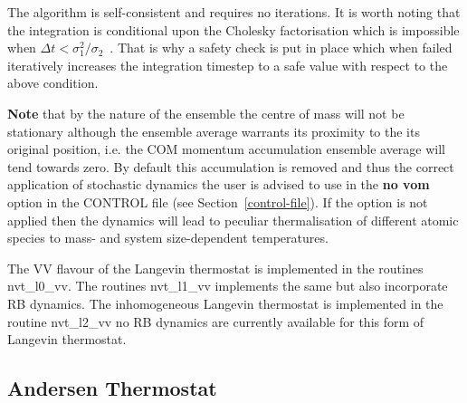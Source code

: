 The algorithm is self-consistent and requires no iterations.
It is worth noting that the integration is conditional upon
the Cholesky factorisation which is impossible when
$\Delta t < \sigma_{1}^{2}/\sigma_{2}$~.  That is why a safety
check is put in place which when failed iteratively increases
the integration timestep to a safe value with respect to the
above condition.

{\bf Note} that by the nature of the ensemble the centre of mass will
not be stationary although the ensemble average warrants its proximity
to the its original position, i.e. the COM momentum accumulation ensemble
average will tend towards zero.  By default this accumulation is removed
and thus the correct application of stochastic dynamics the user is
advised to use in the {\bf no vom} option in the CONTROL file (see
Section~\ref{control-file}).  If the option is not applied then the
dynamics will lead to peculiar thermalisation of different atomic
species to mass- and system size-dependent temperatures.

The VV flavour of the Langevin thermostat is implemented in
the \D routines {\sc nvt\_l0\_vv}.
The routines {\sc nvt\_l1\_vv} implements the
same but also incorporate RB dynamics. The inhomogeneous Langevin
thermostat is implemented in the \D routine {\sc nvt\_l2\_vv} no RB dynamics
are currently available for this form of Langevin thermostat.

\subsection{Andersen Thermostat}

